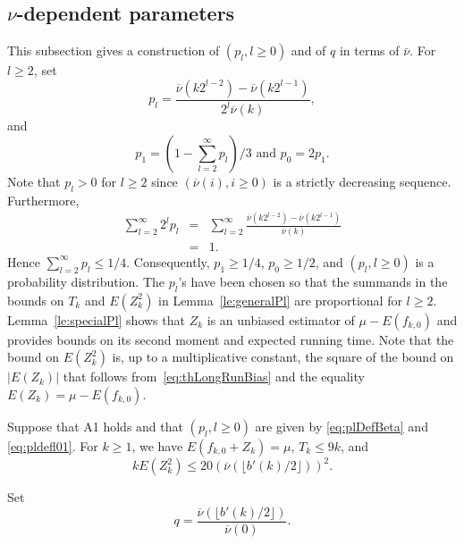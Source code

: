 \documentclass[a4paper,11pt]{article}
\begin{document}
\subsection{\(\nu\)-dependent parameters}
\label{sub:Sdependent}
This subsection gives a construction of   \((p_{l},l\geq0)\)   and of \(q\) in terms of \(\bar\nu\). For \(l\geq2\), set  
\begin{equation}\label{eq:plDefBeta}
p_{l}=\frac{\overline{\nu}(k2^{l-2})-\overline{\nu}(k2^{l-1})}{2^{l}\overline{\nu}(k)},
\end{equation} and
\begin{equation}\label{eq:pldefl01}
p_{1}=(1-\sum^{\infty}_{l=2}p_{l})/3 \text{ and }p_{0}=2p_{1}.
\end{equation}Note that \(p_{l}>0\) for \(l\ge2\) since \((\overline{\nu}(i),i\ge0)  \) 
is a strictly decreasing sequence. Furthermore,\begin{eqnarray}\label{eq:pr2^lnudep}
\sum^{\infty}_{l=2}2^{l}p_{l}&=&\sum^{\infty}_{l=2}\frac{\overline{\nu}(k2^{l-2})-\overline{\nu}(k2^{l-1})}{\overline{\nu}(k)}\nonumber\\
&=&1.\end{eqnarray} Hence \(\sum^{\infty}_{l=2}p_{l}\leq1/4\).  Consequently,   \(p_{1}\ge1/4\),     \(p_{0}\ge1/2\), and \((p_{l},l\geq0)\)  is a probability distribution. The \(p_{l}\)'s have been chosen so that the summands in the bounds on \(T_{k}\) and  \(E(Z_{k}^{2})\) in Lemma~\ref{le:generalPl}  are proportional for \(l\geq2\). Lemma~\ref{le:specialPl} shows that \(Z_{k}\) is an unbiased estimator of  \(\mu-E(f_{k,0})\) and provides  bounds on its  second moment and  expected running time. Note that the bound on \(E(Z_{k}^{2})\) is, up to a multiplicative constant, the square of the bound on \(|E(Z_{k})|\) that follows from~\eqref{eq:thLongRunBias} and  the equality \(E(Z_{k})=\mu-E(f_{k,0})\).    
\begin{lemma}\label{le:specialPl} Suppose that A1 holds and that  \((p_{l},l\geq0)\) are given by \eqref{eq:plDefBeta} and \eqref{eq:pldefl01}. For \(k\ge1\), we have \(E(f_{k,0}+Z_{k})=\mu\), \(T_{k}\le9k\), and \begin{equation}
\label{eq:ZNSecondMoment}
kE(Z_{k}^{2})\le20(\overline{\nu}(\lfloor{b'(k)}/{2}\rfloor))^{2}.
\end{equation}    
\end{lemma}
Set
\begin{equation}\label{eq:defq}
q=\frac{\overline{\nu}(\lfloor{b'(k)}/{2}\rfloor)}{\overline{\nu}(0)}.
\end{equation}
\end{document}
